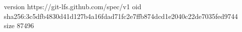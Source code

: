 version https://git-lfs.github.com/spec/v1
oid sha256:3c5dfb4830d41d127b4a16fdad71fc2e7ffb874dcd1e2040c22de7035fed9744
size 87496
